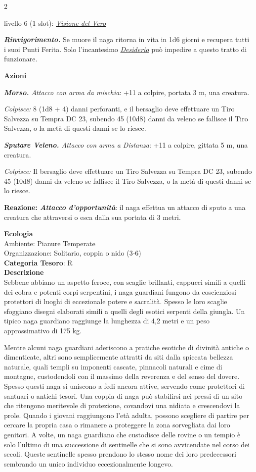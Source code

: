\begin{multicols}{2}
{livello 6 (1 slot): \emph{\hyperlink{Visione del Vero}{Visione del Vero}}

\emph{\textbf{Rinvigorimento.}} Se muore il naga ritorna in vita in 1d6 giorni e recupera tutti i suoi Punti Ferita. Solo l'incantesimo \emph{\hyperlink{Desiderio}{Desiderio}} può impedire a questo tratto di funzionare.

\textbf{Azioni}

\emph{\textbf{Morso.} Attacco con arma da mischia}: +11 a colpire, portata 3 m, una creatura.

\emph{Colpisce:} 8 (1d8 + 4) danni perforanti, e il bersaglio deve effettuare un Tiro Salvezza su Tempra DC 23, subendo 45 (10d8) danni da veleno se fallisce il Tiro Salvezza, o la metà di questi danni se lo riesce.

\emph{\textbf{Sputare Veleno.} Attacco con arma a Distanza}: +11 a colpire, gittata 5 m, una creatura.

\emph{Colpisce:} Il bersaglio deve effettuare un Tiro Salvezza su Tempra DC 23, subendo 45 (10d8) danni da veleno se fallisce il Tiro Salvezza, o la metà di questi danni se lo riesce.

\textbf{Reazione: \emph{Attacco d'opportunità}}: il naga effettua un attacco di sputo a una creatura che attraversi o esca dalla sua portata di 3 metri.

\textbf{Ecologia}\\
Ambiente: Pianure Temperate\\
Organizzazione: Solitario, coppia o nido (3-6)\\
\textbf{Categoria Tesoro}: R\\
\textbf{Descrizione}\\
Sebbene abbiano un aspetto feroce, con scaglie brillanti, cappucci simili a quelli dei cobra e potenti corpi serpentini, i naga guardiani fungono da coscienziosi protettori di luoghi di eccezionale potere e sacralità. Spesso le loro scaglie sfoggiano disegni elaborati simili a quelli degli esotici serpenti della giungla. Un tipico naga guardiano raggiunge la lunghezza di 4,2 metri e un peso approssimativo di 175 kg.

Mentre alcuni naga guardiani aderiscono a pratiche esotiche di divinità antiche o dimenticate, altri sono semplicemente attratti da siti dalla spiccata bellezza naturale, quali templi su imponenti cascate, pinnacoli naturali e cime di montagne, custodendoli con il massimo della reverenza e del senso del dovere. Spesso questi naga si uniscono a fedi ancora attive, servendo come protettori di santuari o antichi tesori. Una coppia di naga può stabilirsi nei pressi di un sito che ritengono meritevole di protezione, covandovi una nidiata e crescendovi la prole. Quando i giovani raggiungono l'età adulta, possono scegliere di partire per cercare la propria casa o rimanere a proteggere la zona sorvegliata dai loro genitori. A volte, un naga guardiano che custodisce delle rovine o un tempio è solo l'ultimo di una successione di sentinelle che si sono avvicendate nel corso dei secoli. Queste sentinelle spesso prendono lo stesso nome dei loro predecessori sembrando un unico individuo eccezionalmente longevo.

}
\end{multicols}
